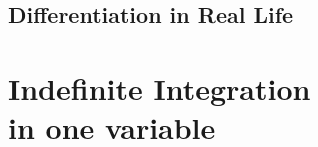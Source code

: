 \chapter{Differentiation in Real Life}







\part{Indefinite Integration\\ \quad in one variable}








\printbibliography[title = {Aliquam}]



